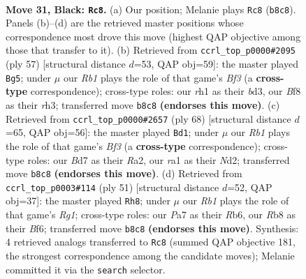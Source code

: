 \documentclass[11pt]{article}
\begin{document}
\clearpage

\begin{figure}[p]\centering
\begin{subfigure}{0.46\textwidth}\centering
\resizebox{\linewidth}{!}{%
\newchessgame
\chessboard[
  setfen={1r2kb2/p1pb1p1r/P1p3p1/2P4p/1P3P1P/2B5/8/RN2K2R b Q - 10 31},
  showmover=false,
  pgfstyle=straightmove, color=movearrow, markmove={b8-c8}
]}
\caption{}
\end{subfigure}\hfill
\begin{subfigure}{0.46\textwidth}\centering
\resizebox{\linewidth}{!}{%
\newchessgame
\chessboard[
  setfen={4k1r1/1r2pp2/3p1b1p/p2P4/Pp6/3B1PPR/1PP5/1K4R1 b - - 4 29},
  showmover=false,
  pgfstyle=straightmove, color=movearrow, markmove={f6-g5}
]}
\caption{}
\end{subfigure}
\\[4pt]
\begin{subfigure}{0.46\textwidth}\centering
\resizebox{\linewidth}{!}{%
\newchessgame
\chessboard[
  setfen={3r3r/1k1n4/2p2pb1/1p4pp/3PP3/2P2BP1/RK1N2P1/7R w - - 0 35},
  showmover=false,
  pgfstyle=straightmove, color=movearrow, markmove={f3-d1}
]}
\caption{}
\end{subfigure}\hfill
\begin{subfigure}{0.46\textwidth}\centering
\resizebox{\linewidth}{!}{%
\newchessgame
\chessboard[
  setfen={4k1r1/4pp2/1r1p1b1p/p2P4/Pp6/5P1R/1PP3P1/1K1R1B2 b - - 0 26},
  showmover=false,
  pgfstyle=straightmove, color=movearrow, markmove={g8-h8}
]}
\caption{}
\end{subfigure}
\caption{\textbf{Move 31, Black: \texttt{Rc8}.} (a) Our position; Melanie plays \texttt{Rc8} (\texttt{b8c8}). Panels (b)--(d) are the retrieved master positions whose correspondence most drove this move (highest QAP objective among those that transfer to it). (b) Retrieved from \texttt{ccrl\_top\_p0000\#2095} (ply 57) [structural distance $d$=53, QAP obj=59]: the master played \texttt{Bg5}; under $\mu$ our \emph{Rb1} plays the role of that game's \emph{Bf3} (a \textbf{cross-type} correspondence); cross-type roles: our \emph{r}h1 as their \emph{b}d3, our \emph{B}f8 as their \emph{r}h3; transferred move \texttt{b8c8} \textbf{(endorses this move)}. (c) Retrieved from \texttt{ccrl\_top\_p0000\#2657} (ply 68) [structural distance $d$=65, QAP obj=56]: the master played \texttt{Bd1}; under $\mu$ our \emph{Rb1} plays the role of that game's \emph{Bf3} (a \textbf{cross-type} correspondence); cross-type roles: our \emph{B}d7 as their \emph{R}a2, our \emph{r}a1 as their \emph{N}d2; transferred move \texttt{b8c8} \textbf{(endorses this move)}. (d) Retrieved from \texttt{ccrl\_top\_p0003\#114} (ply 51) [structural distance $d$=52, QAP obj=37]: the master played \texttt{Rh8}; under $\mu$ our \emph{Rb1} plays the role of that game's \emph{Rg1}; cross-type roles: our \emph{P}a7 as their \emph{R}b6, our \emph{R}b8 as their \emph{B}f6; transferred move \texttt{b8c8} \textbf{(endorses this move)}. Synthesis: 4 retrieved analogs transferred to \texttt{Rc8} (summed QAP objective 181, the strongest correspondence among the candidate moves); Melanie committed it via the \texttt{search} selector.}
\label{fig:thought-m61}
\end{figure}
\end{document}
